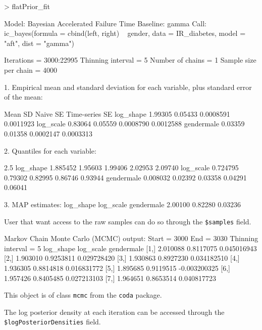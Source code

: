 \documentclass[a4paper]{article}
\begin{document}
\begin{Schunk}
\begin{Sinput}
> flatPrior_fit
\end{Sinput}
\begin{Soutput}
Model:  Bayesian Accelerated Failure Time
Baseline:  gamma 
Call: ic_bayes(formula = cbind(left, right) ~ gender, data = IR_diabetes, 
    model = "aft", dist = "gamma")


Iterations = 3000:22995
Thinning interval = 5 
Number of chains = 1 
Sample size per chain = 4000 

1. Empirical mean and standard deviation for each variable,
   plus standard error of the mean:

              Mean      SD  Naive SE Time-series SE
log_shape  1.99305 0.05433 0.0008591      0.0011923
log_scale  0.83064 0.05559 0.0008790      0.0012588
gendermale 0.03359 0.01358 0.0002147      0.0003313

2. Quantiles for each variable:

               2.5%
log_shape  1.885452 1.95603 1.99406 2.02953 2.09740
log_scale  0.724795 0.79302 0.82995 0.86746 0.93944
gendermale 0.008032 0.02392 0.03358 0.04291 0.06041

3. MAP estimates:
 log_shape  log_scale gendermale 
   2.00100    0.82280    0.03236 
\end{Soutput}
\end{Schunk}

User that want access to the raw samples can do so through the \texttt{\$samples}
field. 

\begin{Schunk}
\begin{Soutput}
Markov Chain Monte Carlo (MCMC) output:
Start = 3000 
End = 3030 
Thinning interval = 5 
     log_shape log_scale   gendermale
[1,]  2.010088 0.8117075  0.045016943
[2,]  1.903010 0.9253811  0.029728420
[3,]  1.930863 0.8927230  0.034182510
[4,]  1.936305 0.8814818  0.016831772
[5,]  1.895685 0.9119515 -0.003200325
[6,]  1.957426 0.8405485  0.027213103
[7,]  1.964651 0.8653514  0.040817723
\end{Soutput}
\end{Schunk}

This object is of class \texttt{mcmc} from the \texttt{coda} package. 

The log posterior density at each iteration can be accessed through the \texttt{\$logPosteriorDensities} field. 
\end{document}
